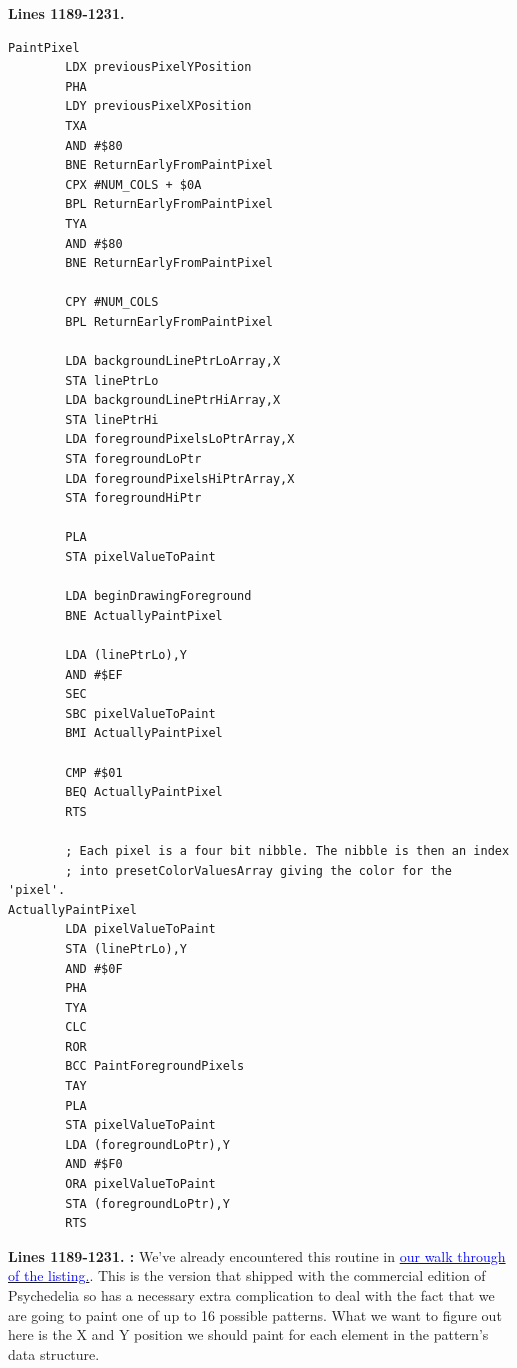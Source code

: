 %
\clearpage
\textbf{Lines 1189-1231. } 
\begin{lstlisting}[basicstyle=\ttfamily\scriptsize, caption=The routine responsible for painting patterns.]
PaintPixel
        LDX previousPixelYPosition
        PHA 
        LDY previousPixelXPosition
        TXA 
        AND #$80
        BNE ReturnEarlyFromPaintPixel
        CPX #NUM_COLS + $0A
        BPL ReturnEarlyFromPaintPixel
        TYA 
        AND #$80
        BNE ReturnEarlyFromPaintPixel

        CPY #NUM_COLS
        BPL ReturnEarlyFromPaintPixel

        LDA backgroundLinePtrLoArray,X
        STA linePtrLo
        LDA backgroundLinePtrHiArray,X
        STA linePtrHi
        LDA foregroundPixelsLoPtrArray,X
        STA foregroundLoPtr
        LDA foregroundPixelsHiPtrArray,X
        STA foregroundHiPtr

        PLA 
        STA pixelValueToPaint

        LDA beginDrawingForeground
        BNE ActuallyPaintPixel

        LDA (linePtrLo),Y
        AND #$EF
        SEC 
        SBC pixelValueToPaint
        BMI ActuallyPaintPixel

        CMP #$01
        BEQ ActuallyPaintPixel
        RTS 

        ; Each pixel is a four bit nibble. The nibble is then an index
        ; into presetColorValuesArray giving the color for the 'pixel'.
ActuallyPaintPixel   
        LDA pixelValueToPaint
        STA (linePtrLo),Y
        AND #$0F
        PHA 
        TYA 
        CLC 
        ROR 
        BCC PaintForegroundPixels
        TAY 
        PLA 
        STA pixelValueToPaint
        LDA (foregroundLoPtr),Y
        AND #$F0
        ORA pixelValueToPaint
        STA (foregroundLoPtr),Y
        RTS 
\end{lstlisting}
\clearpage

\textbf{Lines 1189-1231. :} We've already encountered this routine
in \hyperref[sec:listing_commentary]{\textcolor{blue}{ our walk through of the listing.}}. This is the version that shipped 
with the commercial edition of Psychedelia so has a necessary extra complication to deal with the fact that we 
are going to paint one of up to 16 possible patterns. What we want to figure out here is the X and Y position we should
paint for each element in the pattern's data structure.
\clearpage

